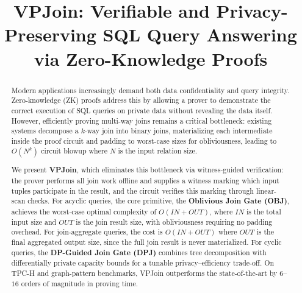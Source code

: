 \documentclass[sigconf]{acmart}
\begin{document}
\title{VPJoin: Verifiable and Privacy-Preserving SQL Query Answering via Zero-Knowledge Proofs
}


\renewcommand{\shortauthors}{Trovato and Tobin, et al.}

\begin{abstract}

Modern applications increasingly demand both data confidentiality and query integrity. Zero-knowledge (ZK) proofs address this by allowing a prover to demonstrate the correct execution of SQL queries on private data without revealing the data itself. However, efficiently proving multi-way joins remains a critical bottleneck: existing systems decompose a $k$-way join into binary joins, materializing each intermediate inside the proof circuit and padding to worst-case sizes for obliviousness, leading to $O(N^k)$ circuit blowup where $N$ is the input relation size. 

We present \textbf{VPJoin}, which eliminates this bottleneck via witness-guided verification: the prover performs all join work offline and supplies a witness marking which input tuples participate in the result, and the circuit verifies this marking through linear-scan checks. For acyclic queries, the core primitive, the \textbf{Oblivious Join Gate (OBJ)}, achieves the worst-case optimal complexity of $O(\mathit{IN} + \mathit{OUT})$, where $\mathit{IN}$ is the total input size and $\mathit{OUT}$ is the join result size, with obliviousness requiring no padding overhead. For join-aggregate queries, the cost is $O(\mathit{IN} + \mathit{OUT})$ where $\mathit{OUT}$ is the final aggregated output size, since the full join result is never materialized. For cyclic queries, the \textbf{DP-Guided Join Gate (DPJ)} combines tree decomposition with differentially private capacity bounds for a tunable privacy--efficiency trade-off. On TPC-H and graph-pattern benchmarks, VPJoin outperforms the state-of-the-art by $6$--$16$ orders of magnitude in proving time.

\end{abstract}



\end{document}
